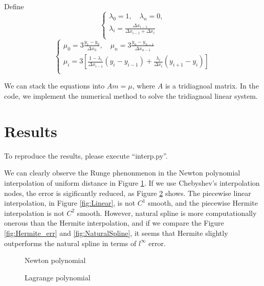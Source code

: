 \documentclass[conference]{IEEEtran}
\begin{document}
Define
\begin{equation}
    \begin{cases}
        \lambda_0 = 1,\quad \lambda_n = 0,\\
        \lambda_i = \frac{\Delta x_{i-1}}{\Delta x_{i-1}+\Delta x_{i}}\\
    \end{cases}
\end{equation}
\begin{equation}
    \begin{cases}
        \mu_0 = 3\frac{y_1-y_0}{\Delta x_0},\quad \mu_n = 3\frac{y_n-y_{n-1}}{\Delta x_{n-1}}\\
        \mu_i = 3[\frac{1-\lambda_i}{\Delta x_{i-1}}(y_i-y_{i-1})+\frac{\lambda_i}{\Delta x_{i}}(y_{i+1}-y_{i})]\\
    \end{cases}
\end{equation}

We can stack the equations into $Am=\mu$, where $A$ is a tridiagnoal matrix. In the code, we implement the numerical method to solve the tridiagnoal linear system.

\section{Results}
To reproduce the results, please execute ``interp.py''.

We can clearly observe the Runge phenonmenon in the Newton polynomial interpolation of uniform distance in Figure \ref{fig:Newton}. If we use Chebyshev's interpolation nodes, the error is sigificantly reduced, as Figure \ref{fig:Lagrange} shows. The piecewise linear interpolation, in Figure \ref{fig:Linear}, is not $C^1$ smooth, and the piecewise Hermite interpolation is not $C^2$ smooth. However, natural spline is more computationally onerous than the Hermite interpolation, and if we compare the Figure \ref{fig:Hermite_err} and \ref{fig:NaturalSpline}, it seems that Hermite slightly outperforms the natural spline in terms of $l^\infty$ error.
\newpage
\begin{figure}[htbp]
    \centering
    \quad
    \caption{Newton polynomial}
    \label{fig:Newton}
\end{figure}

\begin{figure}[htbp]
    \centering
    \quad
    \caption{Lagrange polynomial}
    \label{fig:Lagrange}
\end{figure}
\end{document}
